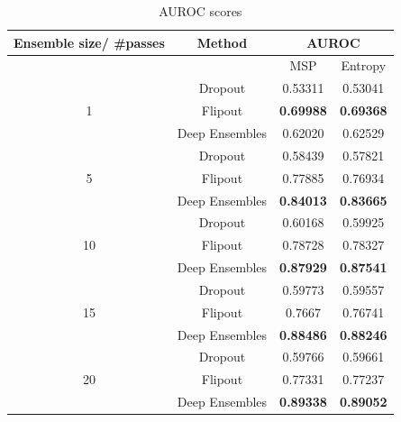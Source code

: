     \begin{table}[h!]
        \centering
        \begin{tabular}{cccc}
        \hline
        Ensemble size/ \#passes & Method               &  \multicolumn{2}{c}{AUROC}          \\ \hline
                                &                      &  MSP              & Entropy         \\ \hline
        \multirow{3}{*}{1}      & Dropout              & 0.53311          & 0.53041          \\
                                & Flipout              & \textbf{0.69988} & \textbf{0.69368} \\
                                & Deep Ensembles       & 0.62020          & 0.62529          \\ \hline
        \multirow{3}{*}{5}      & Dropout              & 0.58439          & 0.57821          \\
                                & Flipout              & 0.77885          & 0.76934          \\
                                & Deep Ensembles       & \textbf{0.84013} & \textbf{0.83665} \\ \hline
        \multirow{3}{*}{10}     & Dropout              & 0.60168          & 0.59925          \\
                                & Flipout              & 0.78728          & 0.78327          \\
                                & Deep Ensembles       & \textbf{0.87929} & \textbf{0.87541} \\ \hline
        \multirow{3}{*}{15}     & Dropout              & 0.59773          & 0.59557          \\
                                & Flipout              & 0.7667           & 0.76741          \\
                                & Deep Ensembles       & \textbf{0.88486} & \textbf{0.88246} \\ \hline
        \multirow{3}{*}{20}     & Dropout              & 0.59766          & 0.59661          \\
                                & Flipout              & 0.77331          & 0.77237          \\
                                & Deep Ensembles       & \textbf{0.89338} & \textbf{0.89052} \\ \hline
        \end{tabular}
        \caption{AUROC scores}
        \label{tab:sem3dvs3dis_auroc}
    \end{table}
